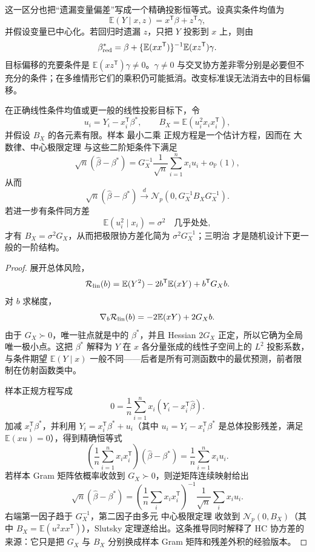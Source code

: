 这一区分也把“遗漏变量偏差”写成一个精确投影恒等式。设真实条件均值为
\[
 \mathbb E(Y\mid x,z)=x^{\mathsf T}\beta+z^{\mathsf T}\gamma,
\]
并假设变量已中心化。若回归时遗漏 $z$，只把 $Y$ 投影到 $x$ 上，则由
\begin{equation}\label{eq:math-stat-omitted-variable-bias}
 \beta^*_{\rm red}
 =\beta
 +\{\mathbb E(xx^{\mathsf T})\}^{-1}\mathbb E(xz^{\mathsf T})\gamma.
\end{equation}
目标偏移的充要条件是 $\mathbb E(xz^{\mathsf T})\gamma\ne0$。$\gamma\ne0$ 与交叉协方差非零分别是必要但不充分的条件；在多维情形它们的乘积仍可能抵消。改变标准误无法消去中的目标偏移。


\begin{theorem}
在正确线性条件均值或更一般的线性投影目标下，令
\[
 u_i=Y_i-x_i^{\mathsf T}\beta^*,
 \qquad
 B_X=\mathbb E(u_i^2x_ix_i^{\mathsf T}),
\]
并假设 $B_X$ 的各元素有限。样本 最小二乘 正规方程是一个估计方程，因而在 大数律、中心极限定理 与这些二阶矩条件下满足
\begin{equation*}\sqrt n(\widehat\beta-\beta^*)
 =G_X^{-1}\frac1{\sqrt n}\sum_{i=1}^nx_iu_i
 +o_{\mathbb P}(1),
\end{equation*}
从而
\begin{equation}\label{eq:math-stat-random-design-sandwich}
 \sqrt n(\widehat\beta-\beta^*)
 \xrightarrow{d}
 \mathcal N_p(0,G_X^{-1}B_XG_X^{-1}).
\end{equation}
若进一步有条件同方差
\[
 \mathbb E(u_i^2\mid x_i)=\sigma^2
 \quad\text{几乎处处},
\]
才有 $B_X=\sigma^2G_X$，从而把极限协方差化简为 $\sigma^2G_X^{-1}$；三明治 才是随机设计下更一般的一阶结构。
\end{theorem}

\begin{proof}
展开总体风险，
\[
 \mathcal R_{\rm lin}(b)
 =\mathbb E(Y^2)-2b^{\mathsf T}\mathbb E(xY)
 +b^{\mathsf T}G_Xb.
\]
对 $b$ 求梯度，
\[
 \nabla_b\mathcal R_{\rm lin}(b)
 =-2\mathbb E(xY)+2G_Xb.
\]
由于 $G_X\succ0$，唯一驻点就是中的 $\beta^*$，并且 Hessian $2G_X$ 正定，所以它确为全局唯一极小点。这把 $\beta^*$ 解释为 $Y$ 在 $x$ 各分量张成的线性子空间上的 $L^2$ 投影系数，与条件期望 $\mathbb E(Y\mid x)$ 一般不同——后者是所有可测函数中的最优预测，前者限制在仿射函数类中。

样本正规方程写成
\[
 0
 =\frac1n\sum_{i=1}^nx_i(Y_i-x_i^{\mathsf T}\widehat\beta).
\]
加减 $x_i^{\mathsf T}\beta^*$，并利用 $Y_i=x_i^{\mathsf T}\beta^*+u_i$（其中 $u_i=Y_i-x_i^{\mathsf T}\beta^*$ 是总体投影残差，满足 $\mathbb E(xu)=0$），得到精确恒等式
\[
 \left(\frac1n\sum_{i=1}^nx_ix_i^{\mathsf T}\right)
 (\widehat\beta-\beta^*)
 =\frac1n\sum_{i=1}^nx_iu_i.
\]
若样本 Gram 矩阵依概率收敛到 $G_X\succ0$，则逆矩阵连续映射给出
\[
 \sqrt n(\widehat\beta-\beta^*)
 =\left(\frac1n\sum_i x_ix_i^{\mathsf T}\right)^{-1}
 \frac1{\sqrt n}\sum_i x_iu_i.
\]
右端第一因子趋于 $G_X^{-1}$，第二因子由多元 中心极限定理 收敛到 $\mathcal N_p(0,B_X)$（其中 $B_X=\mathbb E(u^2xx^{\mathsf T})$），Slutsky 定理遂给出。这条推导同时解释了 HC 协方差的来源：它只是把 $G_X$ 与 $B_X$ 分别换成样本 Gram 矩阵和残差外积的经验版本。
\end{proof}


